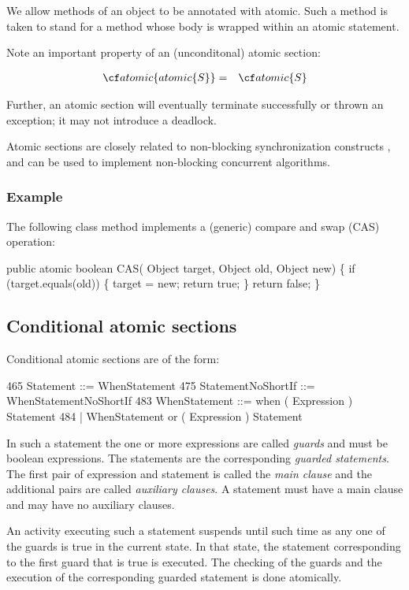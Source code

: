 {{We allow methods of an object to be annotated with {\cf atomic}. Such
a method is taken to stand for a method whose body is wrapped within an
{\cf atomic} statement.

Note an important property of an (unconditonal) atomic section:

\begin{eqnarray}
 {\cf atomic \{ atomic \{ S\}\}} &=& {\cf atomic \{S\}}
\end{eqnarray}

Further, an atomic section will eventually terminate successfully or
thrown an exception; it may not introduce a deadlock.

Atomic sections are closely related to non-blocking synchronization
constructs \cite{Herlihy-non-block}, and can be used to implement 
non-blocking concurrent algorithms.

\subsubsection{Example}

The following class method implements a (generic) compare and swap (CAS) operation:
\begin{x10}
  public atomic boolean CAS( Object target, Object old, Object new) \{
     if (target.equals(old)) \{
       target = new;
       return true;
     \}
     return false;
  \}
\end{x10}

\subsection{Conditional atomic sections}

Conditional atomic sections are of the form:
\begin{x10}
465 Statement ::= WhenStatement
475 StatementNoShortIf ::= WhenStatementNoShortIf
483   WhenStatement ::= when ( Expression ) Statement
484                   | WhenStatement or ( Expression ) Statement
\end{x10}

In such a statement the one or more expressions are called {\em
guards} and must be {\cf boolean} expressions. The statements are the
corresponding {\em guarded statements}. The first pair of expression
and statement is called the {\em main clause} and the additional pairs
are called {\em auxiliary clauses}. A statement must have a main
clause and may have no auxiliary clauses.

An activity executing such a statement suspends until such time as any
one of the guards is true in the current state. In that state, the
statement corresponding to the first guard that is true is executed.
The checking of the guards and the execution of the corresponding
guarded statement is done atomically. 

}}
